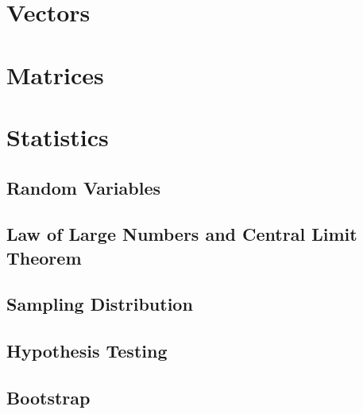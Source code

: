 \ifdefined\printmath

\part{Vectors}







\part{Matrices}


\part{Statistics}
\chapter{Random Variables}


\chapter{Law of Large Numbers and Central Limit Theorem}


\chapter{Sampling Distribution}


\chapter{Hypothesis Testing}


\chapter{Bootstrap}

\fi
